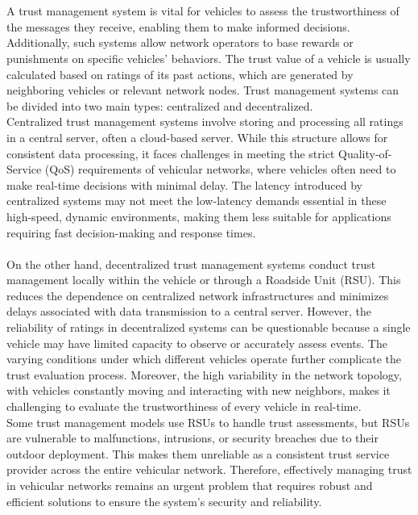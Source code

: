 \documentclass[11pt]{IEEEphot}
\begin{document}
\\
\\
A trust management system is vital for vehicles to assess the trustworthiness of the messages they receive, enabling them to make informed decisions. Additionally, such systems allow network operators to base rewards or punishments on specific vehicles' behaviors. The trust value of a vehicle is usually calculated based on ratings of its past actions, which are generated by neighboring vehicles or relevant network nodes. Trust management systems can be divided into two main types: centralized and decentralized.
\\
Centralized trust management systems involve storing and processing all ratings in a central server, often a cloud-based server. While this structure allows for consistent data processing, it faces challenges in meeting the strict Quality-of-Service (QoS) requirements of vehicular networks, where vehicles often need to make real-time decisions with minimal delay. The latency introduced by centralized systems may not meet the low-latency demands essential in these high-speed, dynamic environments, making them less suitable for applications requiring fast decision-making and response times.
\\
\\
On the other hand, decentralized trust management systems conduct trust management locally within the vehicle or through a Roadside Unit (RSU). This reduces the dependence on centralized network infrastructures and minimizes delays associated with data transmission to a central server. However, the reliability of ratings in decentralized systems can be questionable because a single vehicle may have limited capacity to observe or accurately assess events. The varying conditions under which different vehicles operate further complicate the trust evaluation process. Moreover, the high variability in the network topology, with vehicles constantly moving and interacting with new neighbors, makes it challenging to evaluate the trustworthiness of every vehicle in real-time.
\\
Some trust management models use RSUs to handle trust assessments, but RSUs are vulnerable to malfunctions, intrusions, or security breaches due to their outdoor deployment. This makes them unreliable as a consistent trust service provider across the entire vehicular network. Therefore, effectively managing trust in vehicular networks remains an urgent problem that requires robust and efficient solutions to ensure the system's security and reliability.
\end{document}
